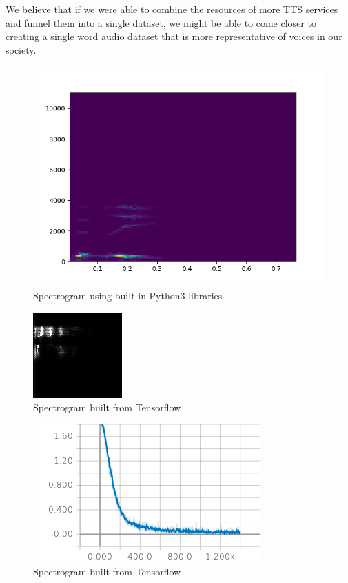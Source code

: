 \documentclass[12pt,journal,compsoc]{IEEEtran}
\begin{document}
We believe that if we were able to combine the resources of more TTS services and funnel them into a single dataset, we might be able to come closer to creating a single word audio dataset that is more representative of voices in our society. 

\begin{figure}[h]
\caption{Spectrogram using built in Python3 libraries}
\vspace{5mm}
\includegraphics[scale=.4]{delete}
\end{figure}

\begin{figure}[h]
\caption{Spectrogram built from Tensorflow}
\vspace{5mm}
\includegraphics[scale=1.4]{spectrogram}
\end{figure}

\begin{figure}[h]
\caption{Spectrogram built from Tensorflow}
\vspace{5mm}
\includegraphics[scale=.7]{first}
\end{figure}
\end{document}
